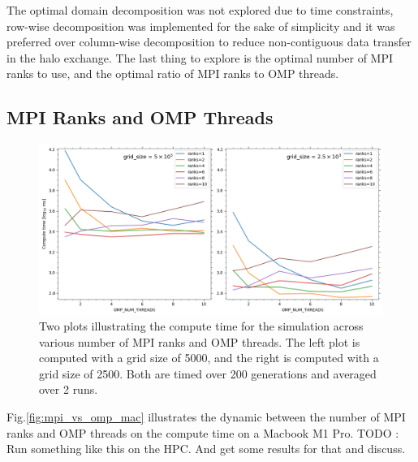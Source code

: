     The optimal domain decomposition was not explored due to time constraints, row-wise decomposition was implemented
    for the sake of simplicity and it was preferred over column-wise decomposition to reduce non-contiguous data transfer
    in the halo exchange.
    The last thing to explore is the optimal number of MPI ranks to use, and the optimal ratio of MPI ranks to OMP threads.

    \subsection{MPI Ranks and OMP Threads}\label{subsec:mpi-omp}
    \begin{figure}[htb]
    \centering
    \includegraphics[width=1\textwidth]{./figures/mpi_vs_omp_mac}
    \caption{Two plots illustrating the compute time for the simulation across various number of MPI ranks and OMP threads.
        The left plot is computed with a grid size of 5000, and the right is computed with a grid size of 2500. Both are
        timed over 200 generations and averaged over 2 runs.}
    \label{fig:mpi_vs_omp_mac}
    \end{figure}

    Fig.\eqref{fig:mpi_vs_omp_mac} illustrates the dynamic between the number of MPI ranks and OMP threads on the compute time
    on a Macbook M1 Pro.
    TODO : Run something like this on the HPC. And get some results for that and discuss.





